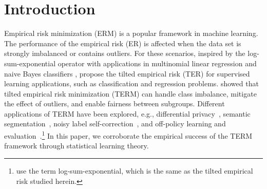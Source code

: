 \documentclass{article}
\theoremstyle{plain}
\theoremstyle{plain}
\theoremstyle{definition}
\theoremstyle{remark}
\begin{document}
\printAffiliationsAndNotice{}  %

\begin{abstract}
The generalization error (risk) of a supervised statistical learning algorithm quantifies its prediction ability on previously unseen data. Inspired by exponential tilting, \citet{li2020tilted} proposed the {\it tilted empirical risk} (TER)  as a non-linear risk metric for machine learning applications such as classification and regression problems. In this work, we examine the generalization error of the tilted empirical risk in the robustness regime under \textit{negative tilt}. Our first contribution is to provide uniform and information-theoretic bounds on the {\it tilted generalization error}, defined as the difference between the population risk and the tilted empirical risk, under negative tilt for unbounded loss function under bounded $(1+\epsilon)$-th moment of loss function for some $\epsilon\in(0,1]$ with a convergence rate of $O(n^{-\epsilon/(1+\epsilon)})$ where $n$ is the number of training samples, revealing a novel application for TER under no distribution shift. Secondly, we study the robustness of the tilted empirical risk with respect to noisy outliers at training time and provide theoretical guarantees under distribution shift for the tilted empirical risk. We empirically corroborate our findings in simple experimental setups where we evaluate our bounds to select the value of tilt in a data-driven manner. 
\end{abstract}

\section{Introduction}\label{sec:intro}

Empirical risk minimization (ERM) is a popular framework in machine learning. The performance of the empirical risk (ER) is affected when the data set is strongly imbalanced  or contains outliers. For these scenarios, 
inspired by the log-sum-exponential operator with applications in multinomial linear regression and naive Bayes classifiers \citep{calafiore2019log,murphy2012machine,williams1998bayesian}, \citet{li2020tilted} propose the tilted empirical risk (TER) for supervised learning applications, such as classification and regression problems. 
\citet{li2020tilted,li2023tilted} showed that tilted empirical risk minimization (TERM) can handle class imbalance, mitigate the effect of outliers, and enable fairness between subgroups. Different applications of TERM 
have been explored, e.g., differential privacy~\citep{lowy2021output}, semantic segmentation~\citep{szabo2021tilted}, noisy label self-correction~\citep{zhou2020robust}, and off-policy learning and evaluation~\citep{behnamnialog}.\footnote{\citet{behnamnialog} use the term log-sum-exponential, which is the same as the tilted empirical risk studied herein.} In this paper, we %
corroborate the empirical success of the TERM framework through  statistical learning theory.
\end{document}
